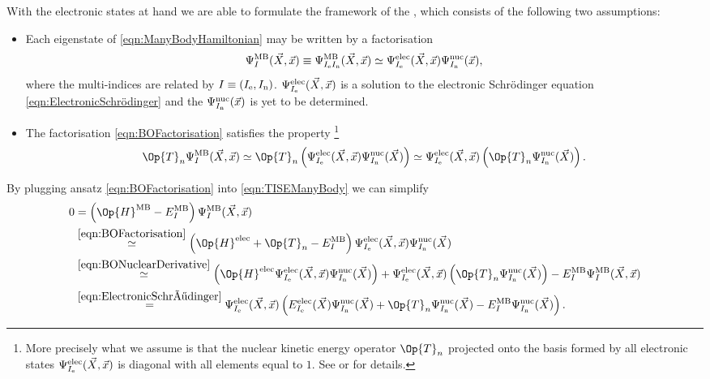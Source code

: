With the electronic states at hand we are able to formulate
the framework of the ,
which consists of the following two assumptions:
\begin{itemize}
	\item Each eigenstate of \eqref{eqn:ManyBodyHamiltonian} may be written
		by a factorisation
	\begin{equation}
		\Psi^\text{MB}_I(\vec{X}, \vec{x}) \equiv \Psi^\text{MB}_{I_\text{e}I_\text{n}}(\vec{X}, \vec{x})
		\simeq \Psi^\text{elec}_{I_\text{e}}(\vec{X}, \vec{x})
		\Psi^\text{nuc}_{I_\text{n}}(\vec{x}),
		\label{eqn:BOFactorisation}
	\end{equation}
	where the multi-indices are related by $I \equiv (I_\text{e}, I_\text{n})$.
	$\Psi^\text{elec}_{I_\text{e}}(\vec{X}, \vec{x})$ is a solution
	to the electronic Schrödinger equation \eqref{eqn:ElectronicSchrödinger}
	and the 
	$\Psi^\text{nuc}_{I_\text{n}}(\vec{x})$ is yet to be determined.
	\item The factorisation \eqref{eqn:BOFactorisation} satisfies the property%
	\footnote{%
		More precisely what we assume is that the nuclear kinetic energy
		operator $\Op{T}_n$ projected onto the basis formed by
		all electronic states $\Psi^\text{elec}_{I_\text{e}}(\vec{X}, \vec{x})$
		is diagonal with all elements equal to $1$.
		See \cite{Baer2006} or \cite{WikipediaBornOppenheimer} for details.
	}
	\begin{equation}
		\Op{T}_n \Psi^\text{MB}_{I}(\vec{X}, \vec{x})
		\simeq \Op{T}_n \left( \Psi^\text{elec}_{\Iel}(\vec{X}, \vec{x})
		\Psi^\text{nuc}_{\Inu}(\vec{X}) \right)
		\simeq \Psi^\text{elec}_{\Iel}(\vec{X}, \vec{x})
		\left(\Op{T}_n \Psi^\text{nuc}_{\Inu}(\vec{X}) \right).
		\label{eqn:BONuclearDerivative}
	\end{equation}
\end{itemize}
By plugging ansatz \eqref{eqn:BOFactorisation} into \eqref{eqn:TISEManyBody}
we can simplify
\begin{align*}
	0 &=
	\left( \Op{H}^\text{MB} - E^\text{MB}_{I} \right)
	\Psi^\text{MB}_{I}(\vec{X}, \vec{x}) \\
	&\stackrel{\eqref{eqn:BOFactorisation}}{\simeq}
	\left( \Op{H}^\text{elec} + \Op{T}_n - E^\text{MB}_I \right)
	\Psi^\text{elec}_{\Iel}(\vec{X}, \vec{x}) \Psi^\text{nuc}_{\Inu}(\vec{X}) \\
	&\stackrel{\eqref{eqn:BONuclearDerivative}}{\simeq}
	\left( \Op{H}^\text{elec} \Psi^\text{elec}_{\Iel}(\vec{X}, \vec{x}) \Psi^\text{nuc}_{\Inu}(\vec{X}) \right)
	+ \Psi^\text{elec}_{\Iel}(\vec{X}, \vec{x}) \left(\Op{T}_n \Psi^\text{nuc}_{\Inu}(\vec{X}) \right)
	- E^\text{MB}_{I} \Psi^\text{MB}_I(\vec{X}, \vec{x})
	\\
	&\stackrel{\eqref{eqn:ElectronicSchrödinger}}{=}
	\Psi^\text{elec}_{\Iel}(\vec{X}, \vec{x})
	\left(E^\text{elec}_{\Iel}(\vec{X}) \Psi^\text{nuc}_{\Inu}(\vec{X})
	+ \Op{T}_n \Psi^\text{nuc}_{\Inu}(\vec{X})
	- E^\text{MB}_I \Psi^\text{nuc}_{\Inu}(\vec{X}) \right).
\end{align*}
